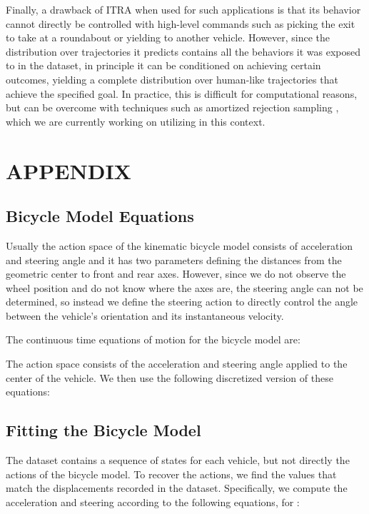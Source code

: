 \documentclass[letterpaper, 10 pt, conference]{ieeeconf}
\begin{document}
Finally, a drawback of ITRA when used for such applications is that its behavior cannot directly be controlled with high-level commands such as picking the exit to take at a roundabout or yielding to another vehicle. However, since the distribution over trajectories it predicts contains all the behaviors it was exposed to in the dataset, in principle it can be conditioned on achieving certain outcomes, yielding a complete distribution over human-like trajectories that achieve the specified goal. In practice, this is difficult for computational reasons, but can be overcome with techniques such as amortized rejection sampling \cite{naderiparizi_amortized_2019, warrington_coping_2020}, which we are currently working on utilizing in this context.


\section*{APPENDIX}

\subsection{Bicycle Model Equations}

Usually the action space of the kinematic bicycle model consists of acceleration and steering angle and it has two parameters defining the distances from the geometric center to front and rear axes. However, since we do not observe the wheel position and do not know where the axes are, the steering angle can not be determined, so instead we define the steering action to directly control the angle  between the vehicle's orientation and its instantaneous velocity.

The continuous time equations of motion for the bicycle model are:

The action space  consists of the acceleration and steering angle applied to the center of the vehicle.
We then use the following discretized version of these equations:


\subsection{Fitting the Bicycle Model} \label{sec:bicycle-fitting}

The dataset contains a sequence of states for each vehicle, but not directly the actions of the bicycle model. To recover the actions, we find the values that match the displacements recorded in the dataset. Specifically, we compute the acceleration and steering according to the following equations, for :
\end{document}
